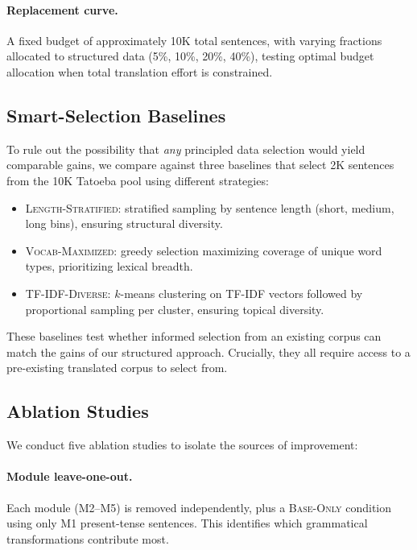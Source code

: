 \documentclass[11pt]{article}
\begin{document}
\paragraph{Replacement curve.} A fixed budget of approximately 10K total sentences, with varying fractions allocated to structured data (5\%, 10\%, 20\%, 40\%), testing optimal budget allocation when total translation effort is constrained.

\subsection{Smart-Selection Baselines}

To rule out the possibility that \emph{any} principled data selection would yield comparable gains, we compare against three baselines that select 2K sentences from the 10K Tatoeba pool using different strategies:

\begin{itemize}
    \item \textsc{Length-Stratified}: stratified sampling by sentence length (short, medium, long bins), ensuring structural diversity.
    \item \textsc{Vocab-Maximized}: greedy selection maximizing coverage of unique word types, prioritizing lexical breadth.
    \item \textsc{TF-IDF-Diverse}: $k$-means clustering on TF-IDF vectors followed by proportional sampling per cluster, ensuring topical diversity.
\end{itemize}

These baselines test whether informed selection from an existing corpus can match the gains of our structured approach. Crucially, they all require access to a pre-existing translated corpus to select from.

\subsection{Ablation Studies}

We conduct five ablation studies to isolate the sources of improvement:

\paragraph{Module leave-one-out.} Each module (M2--M5) is removed independently, plus a \textsc{Base-Only} condition using only M1 present-tense sentences. This identifies which grammatical transformations contribute most.
\end{document}
